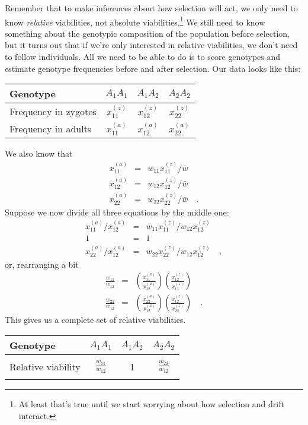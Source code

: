 \documentclass[12pt]{article}
\begin{document}
Remember that to make inferences about how selection will act, we only
need to know {\it relative\/} viabilities, not absolute
viabilities.\footnote{At least that's true until we start worrying
  about how selection and drift interact.} We still need to know
something about the genotypic composition of the population before
selection, but it turns out that if we're only interested in relative
viabilities, we don't need to follow individuals. All we need to be
able to do is to score genotypes and estimate genotype frequencies
before and after selection. Our data looks like this:
\begin{center}
\begin{tabular}{l|ccc}
\hline\hline
Genotype & $A_1A_1$ & $A_1A_2$ & $A_2A_2$ \\
\hline
Frequency in zygotes & $x_{11}^{(z)}$ & $x_{12}^{(z)}$ &
$x_{22}^{(z)}$ \\
Frequency in adults  & $x_{11}^{(a)}$ & $x_{12}^{(a)}$ &
$x_{22}^{(a)}$ \\
\hline
\end{tabular}
\end{center}
We also know that
\begin{eqnarray*}
x_{11}^{(a)} &=& w_{11}x_{11}^{(z)}/\bar w \\
x_{12}^{(a)} &=& w_{12}x_{12}^{(z)}/\bar w \\
x_{22}^{(a)} &=& w_{22}x_{22}^{(z)}/\bar w \quad .
\end{eqnarray*}
Suppose we now divide all three equations by the middle one:
\begin{eqnarray*}
x_{11}^{(a)}/x_{12}^{(a)} &=& w_{11}x_{11}^{(z)}/w_{12}x_{12}^{(z)} \\
1 &=& 1 \\
x_{22}^{(a)}/x_{12}^{(a)} &=& w_{22}x_{22}^{(z)}/w_{12}x_{12}^{(z)} \quad ,
\end{eqnarray*}
or, rearranging a bit
\begin{eqnarray*}
\frac{w_{11}}{w_{12}} &=& \left(\frac{x_{11}^{(a)}}{x_{12}^{(a)}}\right)
                          \left(\frac{x_{12}^{(z)}}{x_{11}^{(z)}}\right) \\
\frac{w_{22}}{w_{12}} &=& \left(\frac{x_{22}^{(a)}}{x_{12}^{(a)}}\right)
                          \left(\frac{x_{12}^{(z)}}{x_{22}^{(z)}}\right)
\quad .
\end{eqnarray*}
This gives us a complete set of relative viabilities.
\begin{center}
\begin{tabular}{l|ccc}
\hline\hline
Genotype & $A_1A_1$ & $A_1A_2$ & $A_2A_2$ \\
\hline
\\
Relative viability & $\frac{w_{11}}{w_{12}}$ & 1 &
$\frac{w_{22}}{w_{12}}$ \\
\\
\hline
\end{tabular}
\end{center}
\end{document}

